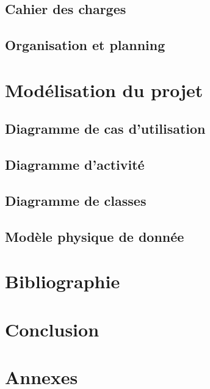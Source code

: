 \documentclass[
  french,
]{article}
\begin{document}
\subsection{Cahier des charges}\label{cahier-des-charges}

\subsection{Organisation et planning}\label{organisation-et-planning}

\newpage{}

\section{Modélisation du projet}\label{moduxe9lisation-du-projet}

\subsection{Diagramme de cas
d'utilisation}\label{diagramme-de-cas-dutilisation}

\subsection{Diagramme d'activité}\label{diagramme-dactivituxe9}

\subsection{Diagramme de classes}\label{diagramme-de-classes}

\subsection{Modèle physique de
donnée}\label{moduxe8le-physique-de-donnuxe9e}

\newpage{}

\section{Bibliographie}\label{bibliographie}

\newpage{}

\section*{Conclusion}\label{conclusion}

\newpage{}

\section*{Annexes}\label{annexes}

\newpage{}
\end{document}
